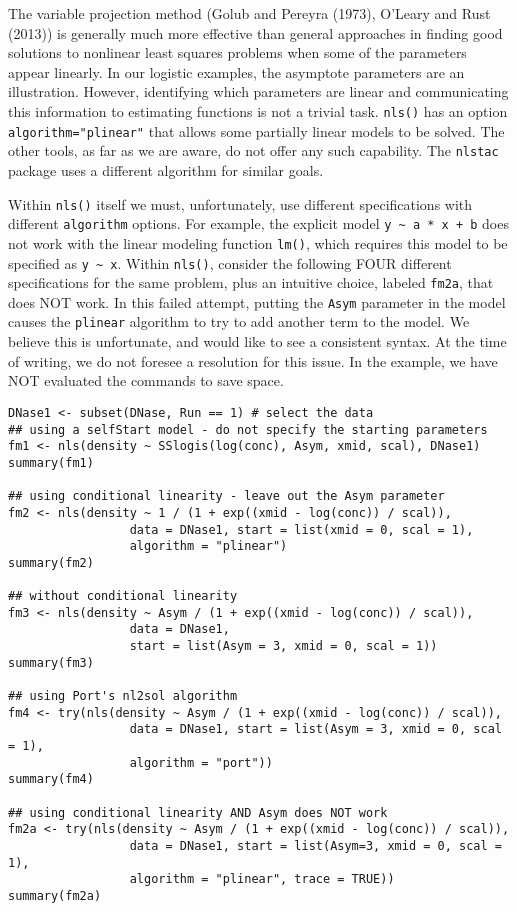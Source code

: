 The variable projection method (Golub and Pereyra (1973), O'Leary and Rust (2013)) is
generally much more effective than general approaches in finding good solutions
to nonlinear least squares
problems when some of the parameters appear linearly. In our logistic examples,
the asymptote parameters are an illustration. However, identifying which parameters
are linear and communicating this information to estimating functions
is not a trivial task. \texttt{nls()} has an option \texttt{algorithm="plinear"} that allows some partially linear
models to be solved. The other tools, as far as we are aware, do not offer any
such capability. The \texttt{nlstac} package uses a different algorithm for similar goals.

Within \texttt{nls()} itself we must, unfortunately, use
different specifications with different \texttt{algorithm} options.
For example, the explicit model \texttt{y\ \textasciitilde{}\ a\ *\ x\ +\ b} does not work with the linear
modeling function \texttt{lm()}, which requires this model to be specified as \texttt{y\ \textasciitilde{}\ x}.
Within \texttt{nls()}, consider the following FOUR different specifications for the same
problem, plus an intuitive choice, labeled \texttt{fm2a}, that does NOT work.
In this failed attempt, putting the \texttt{Asym} parameter in the model causes the
\texttt{plinear} algorithm
to try to add another term to the model. We believe this is unfortunate, and would
like to see a consistent syntax. At the time of writing, we do
not foresee a resolution for this issue. In the example, we have NOT evaluated
the commands to save space.

\begin{verbatim}
DNase1 <- subset(DNase, Run == 1) # select the data
## using a selfStart model - do not specify the starting parameters
fm1 <- nls(density ~ SSlogis(log(conc), Asym, xmid, scal), DNase1)
summary(fm1)

## using conditional linearity - leave out the Asym parameter
fm2 <- nls(density ~ 1 / (1 + exp((xmid - log(conc)) / scal)),
                 data = DNase1, start = list(xmid = 0, scal = 1),
                 algorithm = "plinear")
summary(fm2)

## without conditional linearity
fm3 <- nls(density ~ Asym / (1 + exp((xmid - log(conc)) / scal)),
                 data = DNase1,
                 start = list(Asym = 3, xmid = 0, scal = 1))
summary(fm3)

## using Port's nl2sol algorithm
fm4 <- try(nls(density ~ Asym / (1 + exp((xmid - log(conc)) / scal)),
                 data = DNase1, start = list(Asym = 3, xmid = 0, scal = 1),
                 algorithm = "port"))
summary(fm4)

## using conditional linearity AND Asym does NOT work
fm2a <- try(nls(density ~ Asym / (1 + exp((xmid - log(conc)) / scal)), 
                 data = DNase1, start = list(Asym=3, xmid = 0, scal = 1),
                 algorithm = "plinear", trace = TRUE))
summary(fm2a)
\end{verbatim}

